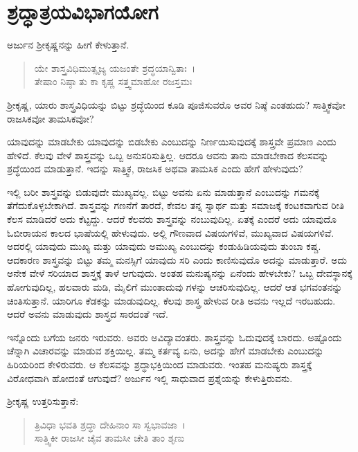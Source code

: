 
\chapter{ಶ್ರದ್ಧಾತ್ರಯವಿಭಾಗಯೋಗ}

ಅರ್ಜುನ ಶ‍್ರೀಕೃಷ್ಣನನ್ನು ಹೀಗೆ ಕೇಳುತ್ತಾನೆ.

\begin{verse}
ಯೇ ಶಾಸ್ತ್ರವಿಧಿಮುತ್ಸೃಜ್ಯ ಯಜಂತೇ ಶ್ರದ್ಧಯಾನ್ವಿತಾಃ~।\\ತೇಷಾಂ ನಿಷ್ಠಾ ತು ಕಾ ಕೃಷ್ಣ ಸತ್ತ್ವಮಾಹೋ ರಜಸ್ತಮಃ 
\end{verse}

{\small ಶ‍್ರೀಕೃಷ್ಣ, ಯಾರು ಶಾಸ್ತ್ರವಿಧಿಯನ್ನು ಬಿಟ್ಟು ಶ್ರದ್ಧೆಯಿಂದ ಕೂಡಿ ಪೂಜಿಸುವರೊ ಅವರ ನಿಷ್ಠೆ ಎಂತಹುದು? ಸಾತ್ತ್ವಿಕವೋ ರಾಜಸಿಕವೋ ತಾಮಸಿಕವೋ?}

ಯಾವುದನ್ನು ಮಾಡಬೇಕು ಯಾವುದನ್ನು ಬಿಡಬೇಕು ಎಂಬುದನ್ನು ನಿರ್ಣಯಿಸುವುದಕ್ಕೆ ಶಾಸ್ತ್ರವೇ ಪ್ರಮಾಣ ಎಂದು ಹೇಳಿದೆ. ಕೆಲವು ವೇಳೆ ಶಾಸ್ತ್ರವನ್ನು ಒಬ್ಬ ಅನುಸರಿಸುತ್ತಿಲ್ಲ. ಆದರೂ ಆವನು ತಾನು ಮಾಡಬೇಕಾದ ಕೆಲಸವನ್ನು ಶ್ರದ್ಧೆಯಿಂದ ಮಾಡುತ್ತಾನೆ. ಇದನ್ನು ಸಾತ್ತ್ವಿಕ, ರಾಜಸಿಕ ಅಥವಾ ತಾಮಸಿಕ ಎಂದು ಹೇಗೆ ಹೇಳುವುದು?

ಇಲ್ಲಿ ಬರೀ ಶಾಸ್ತ್ರವನ್ನು ಬಿಡುವುದೇ ಮುಖ್ಯವಲ್ಲ. ಬಿಟ್ಟು ಅವನು ಏನು ಮಾಡುತ್ತಾನೆ ಎಂಬುದನ್ನು ಗಮನಕ್ಕೆ ತೆಗೆದುಕೊಳ್ಳಬೇಕಾಗಿದೆ. ಶಾಸ್ತ್ರವನ್ನು ಗಣನೆಗೆ ತಾರದೆ, ಕೇವಲ ತನ್ನ ಸ್ವಾರ್ಥ ಮತ್ತು ಸಮಾಜಕ್ಕೆ ಕಂಟಕವಾಗುವ ರೀತಿ ಕೆಲಸ ಮಾಡಿದರೆ ಅದು ಕೆಟ್ಟದ್ದು. ಆದರೆ ಕೆಲವರು ಶಾಸ್ತ್ರವನ್ನು ನಂಬುವುದಿಲ್ಲ. ಏತಕ್ಕೆ ಎಂದರೆ ಅದು ಯಾವುದೊ ಓಬೀರಾಯನ ಕಾಲದ ಭಾಷೆಯಲ್ಲಿ ಹೇಳುವುದು. ಅಲ್ಲಿ ಗೌಣವಾದ ವಿಷಯಗಳಿವೆ, ಮುಖ್ಯವಾದ ವಿಷಯಗಳಿವೆ. ಅದರಲ್ಲಿ ಯಾವುದು ಮುಖ್ಯ ಮತ್ತು ಯಾವುದು ಅಮುಖ್ಯ ಎಂಬುದನ್ನು ಕಂಡುಹಿಡಿಯವುದು ತುಂಬಾ ಕಷ್ಚ. ಆದಕಾರಣ ಶಾಸ್ತ್ರವನ್ನು ಬಿಟ್ಟು ತಮ್ಮ ಮನಸ್ಸಿಗೆ ಯಾವುದು ಸರಿ ಎಂದು ಕಾಣಿಸುವುದೊ ಅದನ್ನು ಮಾಡುತ್ತಾರೆ. ಅದು ಅನೇಕ ವೇಳೆ ಸರಿಯಾದ ಶಾಸ್ತ್ರಕ್ಕೆ ತಾಳೆ ಆಗುವುದು. ಅಂತಹ ಮನುಷ್ಯನನ್ನು ಏನೆಂದು ಹೇಳಬೇಕು? ಒಬ್ಬ ದೇವಸ್ಥಾನಕ್ಕೆ ಹೋಗುವುದಿಲ್ಲ, ಹಲವಾರು ಮಡಿ, ಮೈಲಿಗೆ ಮುಂತಾದುವು ಗಳನ್ನು ಆಚರಿಸುವುದಿಲ್ಲ. ಆದರೆ ಆತ ಭಗವಂತನನ್ನು ಚಿಂತಿಸುತ್ತಾನೆ. ಯಾರಿಗೂ ಕೆಡಕನ್ನು ಮಾಡುವುದಿಲ್ಲ. ಕೆಲವು ಶಾಸ್ತ್ರ ಹೇಳುವ ರೀತಿ ಅವನು ಇಲ್ಲದೆ ಇರಬಹುದು. ಆದರೆ ಅವನು ಮಾಡುವುದು ಶಾಸ್ತ್ರದ ಸಾರದಂತೆ ಇದೆ.

ಇನ್ನೊಂದು ಬಗೆಯ ಜನರು ಇರುವರು. ಅವರು ಅವಿದ್ಯಾವಂತರು. ಶಾಸ್ತ್ರವನ್ನು ಓದುವುದಕ್ಕೆ ಬಾರದು. ಅಷ್ಟೊಂದು ಚೆನ್ನಾಗಿ ವಿಚಾರವನ್ನು ಮಾಡುವ ಶಕ್ತಿಯಿಲ್ಲ. ತಮ್ಮ ಕರ್ತವ್ಯ ಏನು, ಅದನ್ನು ಹೇಗೆ ಮಾಡಬೇಕು ಎಂಬುದನ್ನು ಹಿರಿಯರಿಂದ ಕೇಳಿರುವರು. ಆ ಕೆಲಸವನ್ನು ಶ್ರದ್ಧಾಭಕ್ತಿಯಿಂದ ಮಾಡುವರು. ಇಂತಹ ಮನುಷ್ಯರು ಶಾಸ್ತ್ರಕ್ಕೆ ವಿರೋಧವಾಗಿ ಹೋದಂತೆ ಆಗುವುದೆ? ಅರ್ಜುನ ಇಲ್ಲಿ ಸಾಧುವಾದ ಪ್ರಶ್ನೆಯನ್ನು ಕೇಳುತ್ತಿರುವನು.

ಶ‍್ರೀಕೃಷ್ಣ ಉತ್ತರಿಸುತ್ತಾನೆ:

\begin{verse}
ತ್ರಿವಿಧಾ ಭವತಿ ಶ್ರದ್ಧಾ ದೇಹಿನಾಂ ಸಾ ಸ್ವಭಾವಜಾ~।\\ಸಾತ್ತ್ವಿಕೀ ರಾಜಸೀ ಚೈವ ತಾಮಸೀ ಚೇತಿ ತಾಂ ಶೃಣು 
\end{verse}

